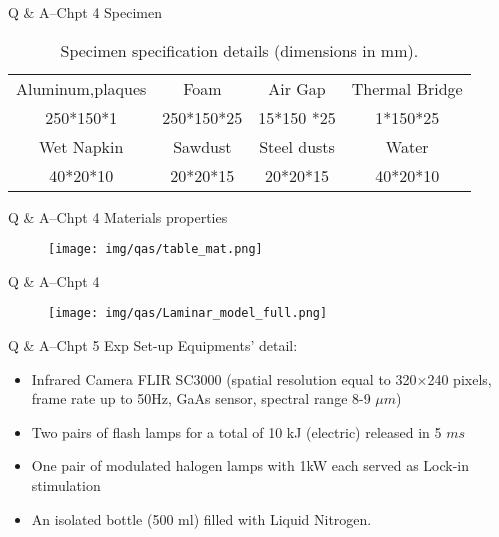 \begin{frame}{Q \& A--Chpt 4 \small{Specimen}}
    \begin{table}
    \centering

    \caption{Specimen specification details (dimensions in mm).}
    \hspace*{-20pt}
    \small
    \begin{tabular}{c|c|c|c}
        \hline
         Aluminum,plaques & Foam       & Air Gap     & Thermal Bridge \\
         250*150*1        & 250*150*25 & 15*150 *25  & 1*150*25       \\ 
         \hline
         Wet Napkin       & Sawdust    & Steel dusts & Water          \\ 
         40*20*10         & 20*20*15   & 20*20*15    & 40*20*10       \\ 
         \hline
    \end{tabular}
    \end{table}
\end{frame}



\begin{frame}{Q \& A--Chpt 4 \small{Materials properties}}
    \begin{figure}[ht]
      \centering
      \texttt{[image: img/qas/table\_mat.png]}
    \end{figure}

\end{frame}



\begin{frame}{Q \& A--Chpt 4 }
    \begin{figure}
      \centering
      \texttt{[image: img/qas/Laminar\_model\_full.png]}
    \end{figure}
\end{frame}

\begin{frame}{Q \& A--Chpt 5 \small{Exp Set-up}}
    Equipments' detail:
    \begin{itemize}
        \item Infrared Camera FLIR SC3000 (spatial resolution equal to 320$\times$240 pixels, frame rate up to 50Hz, GaAs sensor, spectral range 8-9 $\mu m$)
        \item Two pairs of flash lamps for a total of 10 kJ (electric) released in 5 $ms $ 
        \item One pair of modulated halogen lamps with 1kW each served as Lock-in    stimulation   
        \item An isolated bottle (500 ml) filled with  Liquid Nitrogen.
\end{itemize}
\end{frame}


